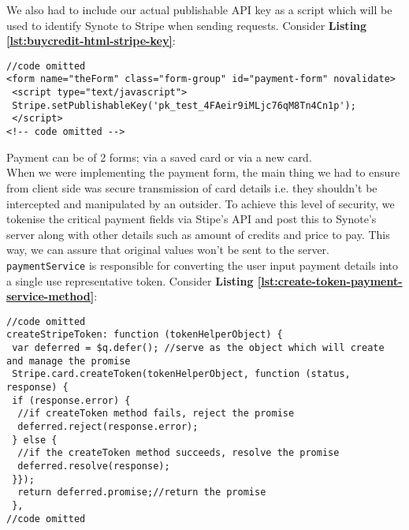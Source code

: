 We also had to include our actual publishable API key as a script which will be used to identify Synote to Stripe when sending requests. Consider \textbf{Listing \ref{lst:buycredit-html-stripe-key}}:\\

\begin{listing}[H]
\begin{verbatim}
//code omitted
<form name="theForm" class="form-group" id="payment-form" novalidate>
 <script type="text/javascript">
 Stripe.setPublishableKey('pk_test_4FAeir9iMLjc76qM8Tn4Cn1p');
 </script>
<!-- code omitted -->
\end{verbatim}
\label{lst:buycredit-html-stripe-key}
\end{listing}

Payment can be of 2 forms; via a saved card or via a new card.\\

When we were implementing the payment form, the main thing we had to ensure from client side was secure transmission of card details i.e. they shouldn't be intercepted and manipulated by an outsider. To achieve this level of security, we tokenise the critical payment fields via Stipe’s API and post this to Synote’s server along with other details such as amount of credits and price to pay. This way, we can assure that original values won't be sent to the server.\\

\texttt{paymentService} is responsible for converting the user input payment details into a single use representative token.  Consider \textbf{Listing \ref{lst:create-token-payment-service-method}}:\\

\begin{listing}[H]
\begin{verbatim}
//code omitted
createStripeToken: function (tokenHelperObject) {
 var deferred = $q.defer(); //serve as the object which will create and manage the promise
 Stripe.card.createToken(tokenHelperObject, function (status, response) {
 if (response.error) {
  //if createToken method fails, reject the promise
  deferred.reject(response.error);
 } else {
  //if the createToken method succeeds, resolve the promise
  deferred.resolve(response);
 }});
  return deferred.promise;//return the promise
 },
//code omitted
\end{verbatim}
\label{lst:create-token-payment-service-method}
\end{listing}

